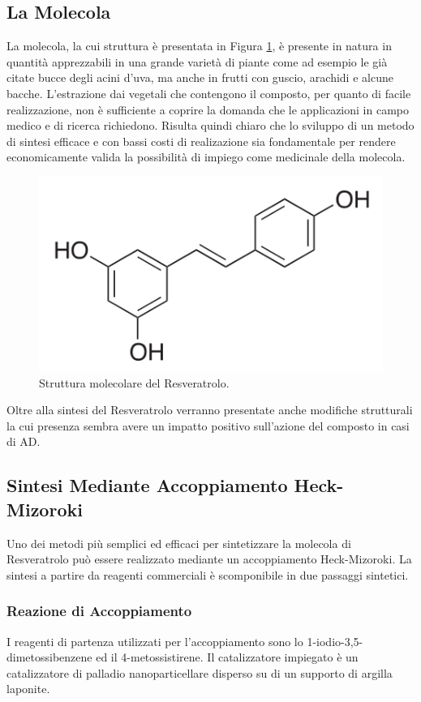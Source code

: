 \documentclass[a4paper, 12pt]{article}
\begin{document}
\subsection{La Molecola}
La molecola, la cui struttura è presentata in Figura \ref{fig:resveratrolo}, è presente in natura in quantità apprezzabili in una grande varietà di piante come ad esempio le già citate bucce degli acini d'uva, ma anche in frutti con guscio, arachidi e alcune bacche. L'estrazione dai vegetali che contengono il composto, per quanto di facile realizzazione, non è sufficiente a coprire la domanda che le applicazioni in campo medico e di ricerca richiedono. Risulta quindi chiaro che lo sviluppo di un metodo di sintesi efficace e con bassi costi di realizazione sia fondamentale per rendere economicamente valida la possibilità di impiego come medicinale della molecola.
\begin{figure}[H]
	\centering
	\includegraphics[width=.5\linewidth]{immagini/resveratrolo.png}
	\caption{Struttura molecolare del Resveratrolo.}
	\label{fig:resveratrolo}
\end{figure}
Oltre alla sintesi del Resveratrolo verranno presentate anche modifiche strutturali la cui presenza sembra avere un impatto positivo sull'azione del composto in casi di AD.

\subsection{Sintesi Mediante Accoppiamento Heck-Mizoroki}
Uno dei metodi più semplici ed efficaci per sintetizzare la molecola di Resveratrolo può essere realizzato mediante un accoppiamento Heck-Mizoroki. La sintesi a partire da reagenti commerciali è scomponibile in due passaggi sintetici.

\subsubsection{Reazione di Accoppiamento}
I reagenti di partenza utilizzati per l'accoppiamento sono lo 1-iodio-3,5-dimetossibenzene ed il 4-metossistirene. Il catalizzatore impiegato è un catalizzatore di palladio nanoparticellare disperso su di un supporto di argilla laponite.
\end{document}
